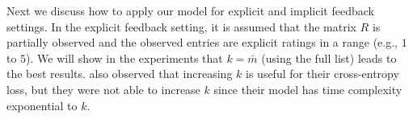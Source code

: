 \documentclass{article}
\begin{document}
Next we discuss how to apply our model for explicit and implicit feedback settings. In the explicit feedback setting, it is assumed that the matrix $R$ is partially observed
and the observed entries are explicit ratings in a range (e.g., $1$ to $5$). 
We will show in the experiments that $k=\bar{m}$ (using the full list) leads to the best results. 
\cite{huang2015listwise} also observed that increasing $k$ is useful for their cross-entropy loss, but they were not able to increase $k$ since their model
has time complexity exponential to $k$. 
\end{document}
